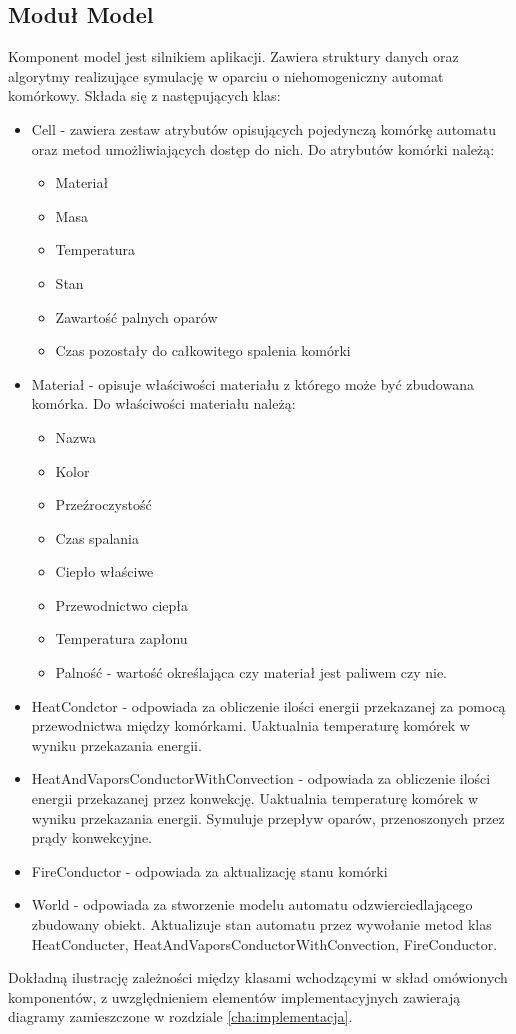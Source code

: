 \subsection {Moduł Model}
Komponent model jest silnikiem aplikacji. Zawiera struktury danych oraz algorytmy realizujące symulację w oparciu o niehomogeniczny automat komórkowy. Składa się z następujących klas:
\begin {itemize}
\item Cell - zawiera zestaw atrybutów opisujących pojedynczą komórkę automatu oraz metod umożliwiających dostęp do nich. Do atrybutów komórki należą:
\begin {itemize}
\item Materiał
\item Masa
\item Temperatura
\item Stan
\item Zawartość palnych oparów
\item Czas pozostały do całkowitego spalenia komórki
\end {itemize}
\item Materiał - opisuje właściwości materiału z którego może być zbudowana komórka.
Do właściwości materiału należą:
\begin {itemize}
\item Nazwa
\item Kolor
\item Przeźroczystość
\item Czas spalania
\item Ciepło właściwe
\item Przewodnictwo ciepła
\item Temperatura zapłonu
\item Palność - wartość określająca czy materiał jest paliwem czy nie.
\end {itemize}
\item HeatCondctor - odpowiada za obliczenie ilości energii przekazanej za pomocą przewodnictwa między komórkami. Uaktualnia temperaturę komórek w wyniku przekazania energii.  
\item HeatAndVaporsConductorWithConvection - odpowiada za obliczenie ilości energii przekazanej przez konwekcję. Uaktualnia temperaturę komórek w wyniku przekazania energii. Symuluje przepływ oparów, przenoszonych przez prądy konwekcyjne.
\item FireConductor - odpowiada za aktualizację stanu komórki
\item World - odpowiada za stworzenie modelu automatu odzwierciedlającego zbudowany obiekt. Aktualizuje stan automatu przez wywołanie metod klas HeatConducter, HeatAndVaporsConductorWithConvection, FireConductor.
\end {itemize}
Dokładną ilustrację zależności między klasami wchodzącymi w skład omówionych komponentów, z uwzględnieniem elementów implementacyjnych zawierają diagramy zamieszczone w rozdziale \ref{cha:implementacja}. %
 
